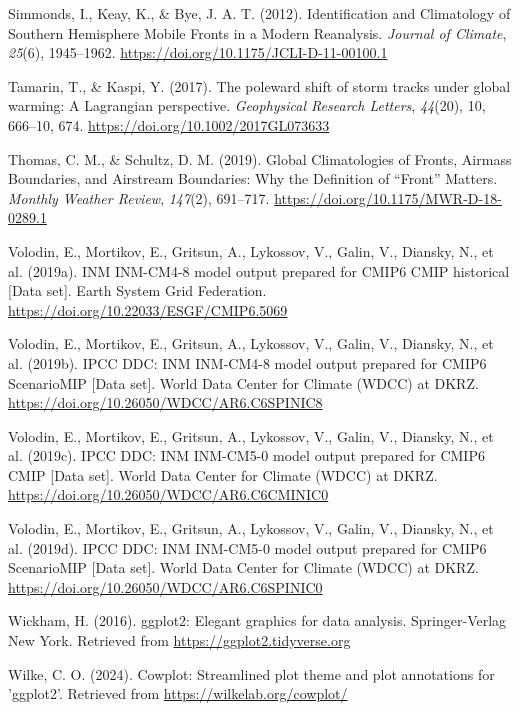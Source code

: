 \documentclass[
]{agujournal2019}
\newlength{\cslhangindent}
\newenvironment{CSLReferences}[2] %
 {\begin{list}{}{%
  \setlength{\itemindent}{0pt}
  \setlength{\leftmargin}{0pt}
  \setlength{\parsep}{0pt}
  \ifodd #1
   \setlength{\leftmargin}{\cslhangindent}
   \setlength{\itemindent}{-1\cslhangindent}
  \fi
  \setlength{\itemsep}{#2\baselineskip}}}
 {\end{list}}
\begin{document}
\begin{CSLReferences}{1}{0}
Simmonds, I., Keay, K., \& Bye, J. A. T. (2012). Identification and
{Climatology} of {Southern Hemisphere Mobile Fronts} in a {Modern
Reanalysis}. \emph{Journal of Climate}, \emph{25}(6), 1945--1962.
\url{https://doi.org/10.1175/JCLI-D-11-00100.1}

Tamarin, T., \& Kaspi, Y. (2017). The poleward shift of storm tracks
under global warming: {A Lagrangian} perspective. \emph{Geophysical
Research Letters}, \emph{44}(20), 10, 666--10, 674.
\url{https://doi.org/10.1002/2017GL073633}

Thomas, C. M., \& Schultz, D. M. (2019). Global {Climatologies} of
{Fronts}, {Airmass Boundaries}, and {Airstream Boundaries}: {Why} the
{Definition} of {``{Front}''} {Matters}. \emph{Monthly Weather Review},
\emph{147}(2), 691--717. \url{https://doi.org/10.1175/MWR-D-18-0289.1}

Volodin, E., Mortikov, E., Gritsun, A., Lykossov, V., Galin, V.,
Diansky, N., et al. (2019a). {INM INM-CM4-8} model output prepared for
{CMIP6 CMIP} historical {[}Data set{]}. Earth System Grid Federation.
\url{https://doi.org/10.22033/ESGF/CMIP6.5069}

Volodin, E., Mortikov, E., Gritsun, A., Lykossov, V., Galin, V.,
Diansky, N., et al. (2019b). {IPCC DDC}: {INM INM-CM4-8} model output
prepared for {CMIP6 ScenarioMIP} {[}Data set{]}. World Data Center for
Climate (WDCC) at DKRZ.
\url{https://doi.org/10.26050/WDCC/AR6.C6SPINIC8}

Volodin, E., Mortikov, E., Gritsun, A., Lykossov, V., Galin, V.,
Diansky, N., et al. (2019c). {IPCC DDC}: {INM INM-CM5-0} model output
prepared for {CMIP6 CMIP} {[}Data set{]}. World Data Center for Climate
(WDCC) at DKRZ. \url{https://doi.org/10.26050/WDCC/AR6.C6CMINIC0}

Volodin, E., Mortikov, E., Gritsun, A., Lykossov, V., Galin, V.,
Diansky, N., et al. (2019d). {IPCC DDC}: {INM INM-CM5-0} model output
prepared for {CMIP6 ScenarioMIP} {[}Data set{]}. World Data Center for
Climate (WDCC) at DKRZ.
\url{https://doi.org/10.26050/WDCC/AR6.C6SPINIC0}

Wickham, H. (2016). ggplot2: Elegant graphics for data analysis.
Springer-Verlag New York. Retrieved from
\url{https://ggplot2.tidyverse.org}

Wilke, C. O. (2024). Cowplot: Streamlined plot theme and plot
annotations for 'ggplot2'. Retrieved from
\url{https://wilkelab.org/cowplot/}

\end{CSLReferences}
\end{document}
